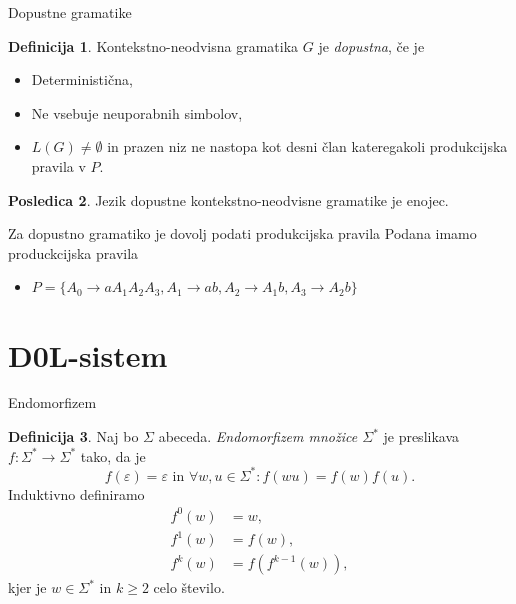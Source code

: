 \documentclass{beamer}
\theoremstyle{definition} %
\newtheorem{definicija}{Definicija}[section]
\newtheorem{posledica}[definicija]{Posledica}
\begin{document}
\begin{frame}{Dopustne gramatike}
    \begin{definicija}
        Kontekstno-neodvisna gramatika $G$ je \textit{dopustna}, če je
        \begin{itemize}
            \item Deterministična,
            \item Ne vsebuje neuporabnih simbolov,
            \item  $ L(G) \neq \emptyset $ in prazen niz ne nastopa kot desni član kateregakoli produkcijska pravila v $ P $.
        \end{itemize}
    \end{definicija}
    \pause
    \begin{posledica}
        Jezik dopustne kontekstno-neodvisne gramatike je enojec.
    \end{posledica}
\end{frame}

\begin{frame}
    \begin{exampleblock}{Za dopustno gramatiko je dovolj podati produkcijska pravila}
        Podana imamo produckcijska pravila 
        \begin{itemize}
            \item $ P = \{ A_0 \rightarrow aA_1A_2A_3, A_1 \rightarrow ab, A_2 \rightarrow A_1b, A_3 \rightarrow A_2b \} $ 
        \end{itemize}
        \pause
        \pause
        \pause
    \end{exampleblock}
\end{frame}

\section{D0L-sistem}

\begin{frame}{Endomorfizem}
    \begin{definicija}
        Naj bo $ \Sigma $ abeceda. \textit{Endomorfizem množice $ \Sigma^* $} je preslikava $ f \colon \Sigma^* \to \Sigma^* $
        tako, da je
        \[
            f(\varepsilon) = \varepsilon \text{ in } \forall w,u \in \Sigma^* \colon f(wu) = f(w)f(u).
        \]
        \pause
        Induktivno definiramo
        \begin{align*}
            f^0(w) &= w, \\
            f^1(w) &= f(w), \\
            f^k(w) &= f(f^{k-1}(w)),
        \end{align*}
        kjer je $ w \in \Sigma^* $ in $ k \geq 2 $ celo število.
    \end{definicija}
\end{frame}
\end{document}
